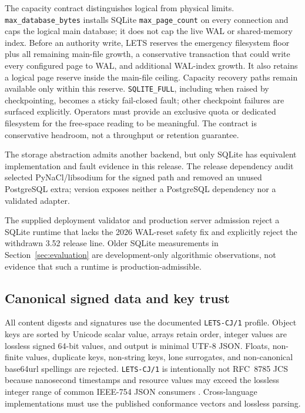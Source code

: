 \documentclass[10pt]{article}
\newcommand{\code}[1]{\nolinkurl{#1}}
\begin{document}
The capacity contract distinguishes logical from physical limits. \code{max_database_bytes}
installs SQLite \code{max_page_count} on every connection and caps the logical main database; it
does not cap the live WAL or shared-memory index. Before an authority write, LETS reserves the
emergency filesystem floor plus all remaining main-file growth, a conservative transaction that
could write every configured page to WAL, and additional WAL-index growth. It also retains a
logical page reserve inside the main-file ceiling. Capacity recovery paths remain available only
within this reserve. \code{SQLITE_FULL}, including when raised by checkpointing, becomes a sticky
fail-closed fault; other checkpoint failures are surfaced explicitly. Operators must provide an
exclusive quota or dedicated filesystem for the free-space reading to be meaningful. The contract
is conservative headroom, not a throughput or retention guarantee.

The storage abstraction admits another backend, but only SQLite has equivalent implementation and
fault evidence in this release. The release dependency audit selected PyNaCl/libsodium for the
signed path and removed an unused PostgreSQL extra; version \ArtifactVersion{} exposes neither a
PostgreSQL dependency nor a validated adapter.

The supplied deployment validator and production server admission reject a SQLite runtime that
lacks the 2026 WAL-reset safety fix and explicitly reject the withdrawn 3.52 release line. Older
SQLite measurements in Section~\ref{sec:evaluation} are development-only algorithmic observations,
not evidence that such a runtime is production-admissible.

\subsection{Canonical signed data and key trust}

All content digests and signatures use the documented \code{LETS-CJ/1} profile. Object keys are
sorted by Unicode scalar value, arrays retain order, integer values are lossless signed 64-bit
values, and output is minimal UTF-8 JSON. Floats, non-finite values, duplicate keys, non-string
keys, lone surrogates, and non-canonical base64url spellings are rejected. \code{LETS-CJ/1} is
intentionally not RFC~8785 JCS because nanosecond timestamps and resource values may exceed the
lossless integer range of common IEEE-754 JSON consumers \citep{rfc8785}. Cross-language
implementations must use the published conformance vectors and lossless parsing.
\end{document}
